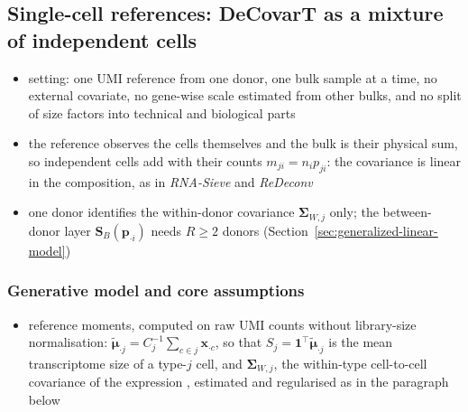\documentclass[pdflatex, sn-nature]{sn-jnl}
\theoremstyle{thmstyleone}%
\theoremstyle{thmstyletwo}%
\theoremstyle{thmstylethree}%
\begin{document}
\subsection{Single-cell references: DeCovarT as a mixture of independent cells}
\label{sec:sc-tailored}

\begin{itemize}
  \item setting: one UMI reference from one donor, one bulk sample at a time, no external covariate, no
        gene-wise scale estimated from other bulks, and no split of size factors into technical and
        biological parts
  \item the reference observes the cells themselves and the bulk is their physical sum, so independent cells add
        with their counts \(m_{ji}=n_{i}p_{ji}\): the covariance is linear in the composition, as in \emph{RNA-Sieve}
        and \emph{ReDeconv} \cite{erdmann-phamLikelihoodbasedDeconvolutionBulk2021,luTranscriptomeSizeMatters2025}
  \item one donor identifies the within-donor covariance \(\boldsymbol{\Sigma}_{W,j}\) only; the between-donor layer
        \(\boldsymbol{S}_{B}(\boldsymbol{p}_{\cdot i})\) needs \(R\ge2\) donors \cite{zimmermanPracticalSolutionPseudoreplication2021}
        (Section~\ref{sec:generalized-linear-model})
\end{itemize}

\subsubsection{Generative model and core assumptions}
\label{sec:sc-generative}

\begin{itemize}
  \item reference moments, computed on raw UMI counts without library-size normalisation:
        \(\tilde{\boldsymbol{\mu}}_{\cdot j}=C_{j}^{-1}\sum_{c\in j}\boldsymbol{x}_{\cdot c}\), so that
        \(S_{j}=\mathbf{1}^{\top}\tilde{\boldsymbol{\mu}}_{\cdot j}\) is the mean transcriptome size of a type-\(j\) cell, and
        \(\boldsymbol{\Sigma}_{W,j}\), the within-type cell-to-cell covariance of the expression
        \cite{sarkarSeparatingMeasurementExpression2021,fangExtrinsicBiologicalStochasticity2025}, estimated and
        regularised as in the paragraph below
\end{itemize}
\end{document}
